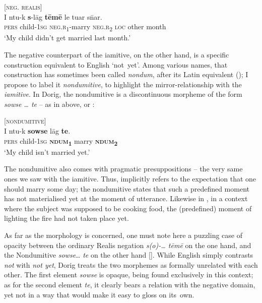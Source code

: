 \documentclass[output=paper,colorlinks,citecolor=brown,draft]{langscibook}
\begin{document}
\ea\label{ex:dor:notmarried}  [\textsc{neg. realis}]\\
    \gll  I ntu-k \textbf{s}-lāg \textbf{tēmē} le tuar s\={n}ar.\\ 
          \textsc{pers} child-\textsc{1sg} \textsc{neg.r\textsubscript{1}}-marry \textsc{neg.r\textsubscript{2}} \textsc{loc} other month\\
    \glt ‘My child didn’t get married last month.’
\z 


The negative counterpart of the iamitive, on the other hand, is a specific construction equivalent to English ‘not~yet’. Among various names, that construction has sometimes been called \textit{nondum}, after its Latin equivalent (\citealt{VeselinovaDevos2021}); I propose to label it \textit{nondumitive}, to highlight the mirror-relationship with the \textit{iamitive}. In Dorig, the nondumitive is a discontinuous morpheme of the form \textit{sowse … te} – as in  above, or :

\ea\label{ex:dor:notyetmarried}  [\textsc{nondumitive}]\\
    \gll  I ntu-k \textbf{sowse} lāg \textbf{te}.\\ 
          \textsc{pers} child-\textsc{1sg} \textbf{\textsc{ndum}\textsubscript{1}} marry \textbf{\textsc{ndum}\textsubscript{2}} \\
    \glt ‘My child isn’t married yet.’
\z 


The nondumitive also comes with pragmatic presuppositions – the very same ones we saw with the iamitive. Thus,  implicitly refers to the expectation that one should marry some day; the nondumitive states that such a predefined moment has not materialised yet at the moment of utterance. Likewise in , in a context where the subject was supposed to be cooking food, the (predefined) moment of lighting the fire had not taken place yet. 

As far as the morphology is concerned, one must note here a puzzling case of opacity between the ordinary Realis negation \textit{s(o)-… tēmē} on the one hand, and the Nondumitive \textit{sowse}…\textit{ te} on the other hand []. While English simply contrasts \textit{not} with \textit{not yet}, Dorig treats the two morphemes as formally unrelated with each other. The first element \textit{sowse} is opaque, being found exclusively in this context; as for the second element \textit{te}, it clearly bears a relation with the negative domain, yet not in a way that would make it easy to gloss on its~own.
\end{document}
